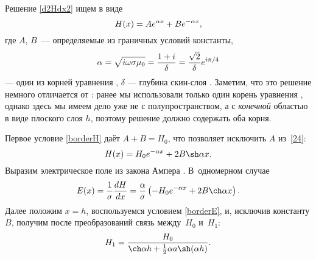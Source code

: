 Решение \eqref{d2Hdx2} ищем в виде
\begin{equation} \eqmark{24}
H(x)=A e^{\alpha x}+ B e^{-\alpha x},
\end{equation}
где $A$, $B$~--- определяемые из граничных условий константы,
\begin{equation}\eqmark{alpha}
\alpha=\sqrt{i\omega \sigma \mu_0}=\frac{1+i}{\delta} =
\frac{\sqrt{2}}{\delta} e^{i\pi/4}
\end{equation} --- один из корней уравнения ,
$\delta$ --- глубина скин-слоя .
Заметим, что это решение немного отличается от : ранее мы использовали только
один корень уравнения , однако здесь мы имеем дело уже не с
полупространством, а с \emph{конечной} областью в виде плоского слоя $h$,
поэтому решение должно содержать оба корня.

Первое условие \eqref{borderH} даёт $A+B = H_0$, что
позволяет исключить $A$ из~\eqref{24}:
\[
H(x) = H_0 e^{-\alpha x} + 2B \sh \alpha x.
\]
Выразим электрическое поле из закона Ампера .
В~одномерном случае
\[
E(x) = \frac{1}{\sigma} \frac{dH}{dx} =
\frac{\alpha}{\sigma}\left(-H_0 e^{-\alpha x}+ 2B \ch \alpha x\right).
\]
Далее положим $x=h$, воспользуемся условием \eqref{borderE},
и, исключив константу $B$, получим после преобразований связь
между~$H_0$ и~$H_1$:
\begin{equation}\eqmark{H0H1}
H_1 = \frac{H_0}{\ch \alpha h + \frac12 \alpha a \sh (\alpha h)}.
\end{equation}

